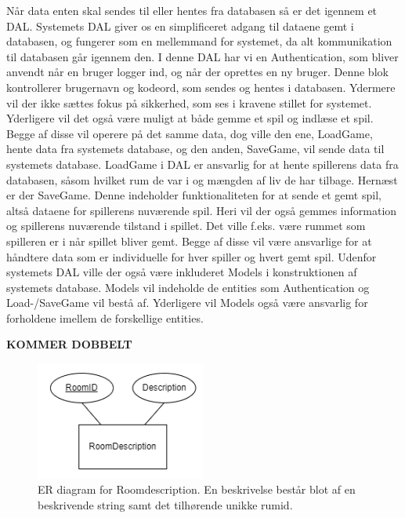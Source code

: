 Når data enten skal sendes til eller hentes fra databasen så er det igennem et DAL. Systemets DAL giver os en simplificeret adgang til dataene gemt i databasen, og fungerer som en mellemmand for systemet, da alt kommunikation til databasen går igennem den.
I denne DAL har vi en Authentication, som bliver anvendt når en bruger logger ind, og når der oprettes en ny bruger. Denne blok kontrollerer brugernavn og kodeord, som sendes og hentes i databasen. Ydermere vil der ikke sættes fokus på sikkerhed, som ses i kravene stillet for systemet.
Yderligere vil det også være muligt at både gemme et spil og indlæse et spil. Begge af disse vil operere på det samme data, dog ville den ene, LoadGame, hente data fra systemets database, og den anden, SaveGame, vil sende data til systemets database. 
LoadGame i DAL er ansvarlig for at hente spillerens data fra databasen, såsom hvilket rum de var i og mængden af liv de har tilbage. 
Hernæst er der SaveGame. Denne indeholder funktionaliteten for at sende et gemt spil, altså dataene for spillerens nuværende spil. Heri vil der også gemmes information og spillerens nuværende tilstand i spillet. Det ville f.eks. være rummet som spilleren er i når spillet bliver gemt.
Begge af disse vil være ansvarlige for at håndtere data som er individuelle for hver spiller og hvert gemt spil.
Udenfor systemets DAL ville der også være inkluderet Models i konstruktionen af systemets database. Models vil indeholde de entities som Authentication og Load-/SaveGame vil bestå af. Yderligere vil Models også være ansvarlig for forholdene imellem de forskellige entities. 

\textbf{KOMMER DOBBELT}

\begin{figure}[H]
\centering
\includegraphics[width = 0.5\textwidth]{02-Body/Images/ER-RoomDescription.PNG}
\caption{ER diagram for Roomdescription. En beskrivelse består blot af en beskrivende string samt det tilhørende unikke rumid.}
\label{fig:ER-Roomdescription}
\end{figure}

